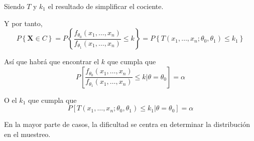 Siendo $T$ y $k_1$ el resultado de simplificar el cociente.

Y por tanto, 
\begin{equation*}
P\left\{\boldsymbol{X}\in C\right\}=P\left\{\dfrac{f_{\theta_0}(x_1,\ldots,x_n)}{f_{\theta_1}(x_1,\ldots,x_n)}\leq k\right\}=P\left\{T(x_1,\ldots,x_n;\theta_0,\theta_1)\leq k_1\right\}
\end{equation*}

As\'i que habr\'a que encontrar el $k$ que cumpla que 
\begin{equation*}
P\left[\dfrac{f_{\theta_0}(x_1,\ldots,x_n)}{f_{\theta_1}(x_1,\ldots,x_n)}\leq k|\theta=\theta_0\right]=\alpha
\end{equation*}

O el $k_1$ que cumpla que
\begin{equation*}
P\left[T(x_1,\ldots,x_n;\theta_0,\theta_1)\leq k_1|\theta=\theta_0\right]=\alpha
\end{equation*}

En la mayor parte de casos, la dificultad se centra en determinar la distribuci\'on en el muestreo.
